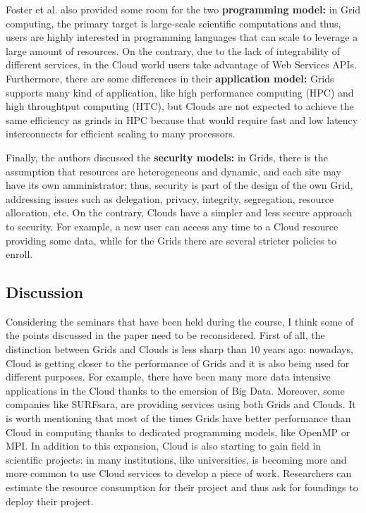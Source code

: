 \documentclass[a4paper]{IEEEtran}
\begin{document}
Foster et al. also provided some room for the two \textbf{programming model:} in Grid computing, the primary target is large-scale scientific computations and thus, users are highly interested in programming languages that can scale to leverage a large amount of resources. On the contrary, due to the lack of integrability of different services, in the Cloud world users take advantage of Web Services APIs.
Furthermore, there are some differences in their \textbf{application model:} Grids supports many kind of application, like high performance computing (HPC) and high throughtput computing (HTC), but Clouds are not expected to achieve the same efficiency as grinds in HPC because that would require fast and low latency interconnects for efficient scaling to many processors.

Finally, the authors discussed the \textbf{security models:} in Grids, there is the assumption that resources are heterogeneous and dynamic, and each site may have its own amministrator; thus, security is part of the design of the own Grid, addressing issues such as delegation, privacy, integrity, segregation, resource allocation, etc. On the contrary, Clouds have a simpler and less secure approach to security. For example, a new user can access any time to a Cloud resource providing some data, while for the Grids there are several stricter policies to enroll.

\subsection{Discussion}

Considering the seminars that have been held during the course, I think some of the points discussed in the paper need to be reconsidered. First of all, the distinction between Grids and Clouds is less sharp than 10 years ago: nowadays, Cloud is getting closer to the performance of Grids and it is also being used for different purposes. For example, there have been many more data intensive applications in the Cloud thanks to the emersion of Big Data. Moreover, some companies like SURFsara, are providing services using both Grids and Clouds. It is worth mentioning that most of the times Grids have better performance than Cloud in computing thanks to dedicated programming models, like OpenMP or MPI.
In addition to this expansion, Cloud is also starting to gain field in scientific projects: in many institutions, like universities, is becoming more and more common to use Cloud services to develop a piece of work. Researchers can estimate the resource consumption for their project and thus ask for foundings to deploy their project.
\end{document}
